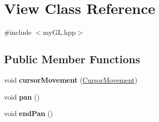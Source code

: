 \hypertarget{classView}{}\section{View Class Reference}
\label{classView}


{\ttfamily \#include $<$my\+G\+L.\+hpp$>$}

\subsection*{Public Member Functions}
\begin{DoxyCompactItemize}
\item 
\hypertarget{classView_aaef0a135309a5f4d347b6f5457ed5167}{}void {\bfseries cursor\+Movement} (\hyperlink{classCursorMovement}{Cursor\+Movement})\label{classView_aaef0a135309a5f4d347b6f5457ed5167}

\item 
\hypertarget{classView_a7032cb10b429abdd9bf2dcd2bea16e40}{}void {\bfseries pan} ()\label{classView_a7032cb10b429abdd9bf2dcd2bea16e40}

\item 
\hypertarget{classView_ac714b40d77c196fe0fd7c86e89a477fa}{}void {\bfseries end\+Pan} ()\label{classView_ac714b40d77c196fe0fd7c86e89a477fa}

\end{DoxyCompactItemize}
